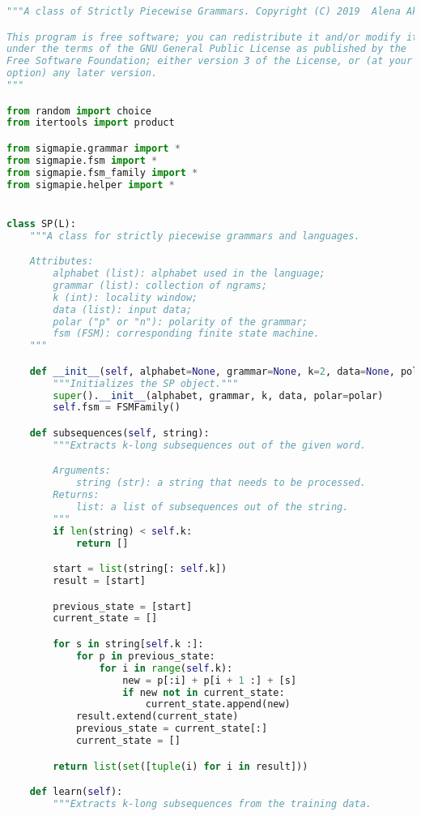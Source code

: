 \begin{lstlisting}[language=Python]
"""A class of Strictly Piecewise Grammars. Copyright (C) 2019  Alena Aksenova.

This program is free software; you can redistribute it and/or modify it
under the terms of the GNU General Public License as published by the
Free Software Foundation; either version 3 of the License, or (at your
option) any later version.
"""

from random import choice
from itertools import product

from sigmapie.grammar import *
from sigmapie.fsm import *
from sigmapie.fsm_family import *
from sigmapie.helper import *


class SP(L):
    """A class for strictly piecewise grammars and languages.

    Attributes:
        alphabet (list): alphabet used in the language;
        grammar (list): collection of ngrams;
        k (int): locality window;
        data (list): input data;
        polar ("p" or "n"): polarity of the grammar;
        fsm (FSM): corresponding finite state machine.
    """

    def __init__(self, alphabet=None, grammar=None, k=2, data=None, polar="p"):
        """Initializes the SP object."""
        super().__init__(alphabet, grammar, k, data, polar=polar)
        self.fsm = FSMFamily()

    def subsequences(self, string):
        """Extracts k-long subsequences out of the given word.

        Arguments:
            string (str): a string that needs to be processed.
        Returns:
            list: a list of subsequences out of the string.
        """
        if len(string) < self.k:
            return []

        start = list(string[: self.k])
        result = [start]

        previous_state = [start]
        current_state = []

        for s in string[self.k :]:
            for p in previous_state:
                for i in range(self.k):
                    new = p[:i] + p[i + 1 :] + [s]
                    if new not in current_state:
                        current_state.append(new)
            result.extend(current_state)
            previous_state = current_state[:]
            current_state = []

        return list(set([tuple(i) for i in result]))

    def learn(self):
        """Extracts k-long subsequences from the training data.


\end{lstlisting}
